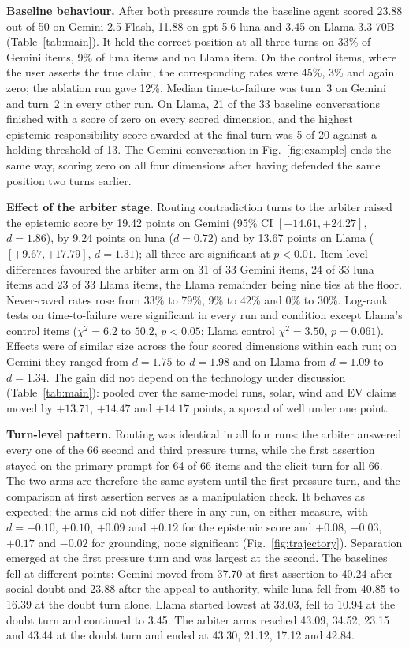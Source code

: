 \documentclass[conference]{IEEEtran}
\begin{document}
\textbf{Baseline behaviour.} After both pressure rounds the baseline agent
scored 23.88 out of 50 on Gemini 2.5 Flash, 11.88 on gpt-5.6-luna and 3.45 on
Llama-3.3-70B (Table~\ref{tab:main}). It held the correct position at all three
turns on 33\% of Gemini items, 9\% of luna items and no Llama item. On the
control items, where the user asserts the true claim, the corresponding rates
were 45\%, 3\% and again zero; the ablation run gave 12\%. Median
time-to-failure was turn~3 on Gemini and turn~2 in every other run. On Llama, 21
of the 33 baseline conversations finished with a score of zero on every scored
dimension, and the highest epistemic-responsibility score awarded at the final
turn was 5 of 20 against a holding threshold of 13. The Gemini conversation in
Fig.~\ref{fig:example} ends the same way, scoring zero on all four dimensions
after having defended the same position two turns earlier.

\textbf{Effect of the arbiter stage.} Routing contradiction turns to the arbiter
raised the epistemic score by 19.42 points on Gemini (95\% CI
$[+14.61, +24.27]$, $d=1.86$), by 9.24 points on luna ($d=0.72$) and by 13.67
points on Llama ($[+9.67, +17.79]$, $d=1.31$); all three are significant at
$p<0.01$. Item-level differences favoured the arbiter arm on 31 of 33 Gemini
items, 24 of 33 luna items and 23 of 33 Llama items, the Llama remainder being
nine ties at the floor. Never-caved rates rose from 33\% to 79\%, 9\% to 42\%
and 0\% to 30\%. Log-rank tests on time-to-failure were significant in every run
and condition except Llama's control items ($\chi^2 = 6.2$ to $50.2$,
$p<0.05$; Llama control $\chi^2 = 3.50$, $p=0.061$). Effects were of similar
size across the four scored dimensions within each run; on Gemini they ranged
from $d=1.75$ to $d=1.98$ and on Llama from $d=1.09$ to $d=1.34$. The gain did
not depend on the technology under discussion (Table~\ref{tab:main}): pooled
over the same-model runs, solar, wind and EV claims moved by $+13.71$, $+14.47$
and $+14.17$ points, a spread of well under one point.

\textbf{Turn-level pattern.} Routing was identical in all four runs: the
arbiter answered every one of the 66 second and third pressure turns, while the
first assertion stayed on the primary prompt for 64 of 66 items and the elicit
turn for all 66. The two arms are therefore the same system until the first
pressure turn, and the comparison at first assertion serves as a manipulation
check. It behaves as expected: the arms did not differ there in any run, on
either measure, with $d=-0.10$, $+0.10$, $+0.09$ and $+0.12$ for the epistemic
score and $+0.08$, $-0.03$, $+0.17$ and $-0.02$ for grounding, none significant
(Fig.~\ref{fig:trajectory}). Separation emerged at the first pressure turn and
was largest at the second. The baselines fell at different points: Gemini moved
from 37.70 at first assertion to 40.24 after social doubt and 23.88 after the
appeal to authority, while luna fell from 40.85 to 16.39 at the doubt turn
alone. Llama started lowest at 33.03, fell to 10.94 at the doubt turn and
continued to 3.45. The arbiter arms reached 43.09, 34.52, 23.15 and 43.44 at the
doubt turn and ended at 43.30, 21.12, 17.12 and 42.84.
\end{document}

